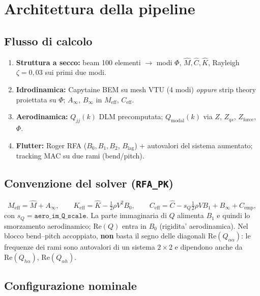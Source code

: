 \documentclass[11pt,a4paper]{article}
\begin{document}
\section{Architettura della pipeline}

\subsection{Flusso di calcolo}

\begin{enumerate}[nosep]
  \item \textbf{Struttura a secco:} beam 100 elementi $\to$ modi $\Phi$, $\hat{M},\hat{C},\hat{K}$,
        Rayleigh $\zeta=0{,}03$ sui primi due modi.
  \item \textbf{Idrodinamica:} Capytaine BEM su mesh VTU (4 modi) \emph{oppure} strip theory
        proiettata su $\Phi$; $A_\infty$, $B_\infty$ in $M_\mathrm{eff}$, $C_\mathrm{eff}$.
  \item \textbf{Aerodinamica:} $Q_{jj}(k)$ DLM precomputata; $Q_\mathrm{modal}(k)$ via
        $Z$, $Z_{qs}$, $Z_\mathrm{force}$, $\Phi$.
  \item \textbf{Flutter:} Roger RFA ($B_0,B_1,B_2,\,B_\mathrm{lag}$) + autovalori del sistema
        aumentato; tracking MAC su due rami (bend/pitch).
\end{enumerate}

\subsection{Convenzione del solver (\texttt{RFA\_PK})}

\[
  M_\mathrm{eff} = \hat{M} + A_\infty,
  \qquad
  K_\mathrm{eff} = \hat{K} - \tfrac{1}{2}\rho V^2 B_0,
  \qquad
  C_\mathrm{eff} = \hat{C} - s_Q \tfrac{1}{2}\rho V B_1 + B_\infty + C_\mathrm{emp},
\]
con $s_Q=\texttt{aero\_im\_Q\_scale}$.
La parte immaginaria di $Q$ alimenta $B_1$ e quindi lo smorzamento aerodinamico;
$\mathrm{Re}(Q)$ entra in $B_0$ (rigidita' aerodinamica).
Nel blocco bend--pitch accoppiato, \textbf{non} basta il segno delle diagonali
$\mathrm{Re}(Q_{\alpha\alpha})$: le frequenze dei rami sono autovalori di un sistema
$2\times2$ e dipendono anche da $\mathrm{Re}(Q_{h\alpha})$, $\mathrm{Re}(Q_{\alpha h})$.

\subsection{Configurazione nominale}
\end{document}

